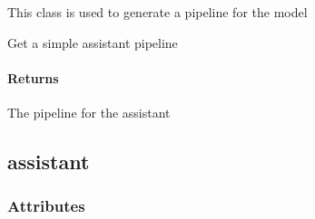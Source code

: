 \documentclass[letterpaper,10pt,english]{sphinxmanual}
\begin{document}
\begin{fulllineitems}
\label{\detokenize{autoapi/pipeline/index:pipeline.llm_pipeline}}
\pysigstartsignatures
{}
\pysigstopsignatures
\sphinxAtStartPar
This class is used to generate a pipeline for the model

\begin{fulllineitems}
\label{\detokenize{autoapi/pipeline/index:pipeline.llm_pipeline.get_simple_assistant}}
\pysigstartsignatures
{}
\pysigstopsignatures
\sphinxAtStartPar
Get a simple assistant pipeline


\paragraph{Returns}
\label{\detokenize{autoapi/pipeline/index:returns}}\begin{description}
\sphinxAtStartPar
The pipeline for the assistant

\end{description}

\end{fulllineitems}


\end{fulllineitems}


\sphinxstepscope


\subsection{assistant}
\label{\detokenize{autoapi/assistant/index:module-assistant}}\label{\detokenize{autoapi/assistant/index:assistant}}\label{\detokenize{autoapi/assistant/index::doc}}

\subsubsection{Attributes}
\label{\detokenize{autoapi/assistant/index:attributes}}
\end{document}
